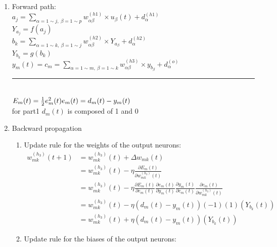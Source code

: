 \documentclass[12pt,a4paper]{article}
\begin{document}
\begin{CJK}{UTF8}{bsmi}
\begin{enumerate}
	\vspace{0.7cm}
	\item Forward path:
\vspace{0.5cm}
\\	
	$a_j=\sum\limits_{\alpha=1 \sim j,\  \beta=1 \sim p}
w_{\alpha\beta}^{(h1)} \times u_\beta(t)+d_\alpha^{(h1)} $
\vspace{0.5cm}
\\
	$Y_{a_j}=f(a_j)$
\vspace{0.5cm}
\\
	$b_k=\sum\limits_{\alpha=1 \sim k,\  \beta=1 \sim j}
w_{\alpha\beta}^{(h2)} \times Y_{a_\beta}+d_\alpha^{(h2)} $
\vspace{0.5cm}
\\
	$Y_{b_k}=g(b_k)$
\vspace{0.5cm}
\\
	$y_m(t)=c_m=\sum\limits_{\alpha=1 \sim m,\  \beta=1 \sim k}
	w_{\alpha\beta}^{(h3)} \times y_{b_\beta}+d_\alpha^{(o)} $
\\[0.5cm]
\noindent\rule{\textwidth}{1pt}
\\[0.5cm]
$E_m(t)=\frac{1}{2}e_m^2(t)
\\[0.5cm]
e_m(t)=d_m(t)-y_m(t)
$
\\[0.3cm]
for part1 $d_m(t)$ is composed of 1 and 0
\newpage
\item Backward propagation
\begin{enumerate}
	\item Update rule for the weights of the output neurons:
\vspace{0.5cm}
\\
$
	\begin{aligned}
	w_{mk}^{(h_3)}(t+1) & =w_{mk}^{(h_3)}(t)+\Delta w_{mk}(t)
\\[0.5cm]
	& =	w_{mk}^{(h_3)}(t)-\eta\frac{\partial E_m(t)}{\partial w_{mk}^{(h_3)}(t)}
\\[0.5cm]
	& = w_{mk}^{(h_3)}(t)-\eta\frac{\partial E_m(t)}{\partial e_{m}(t)}
	\frac{\partial e_{m}(t)}{\partial y_m(t)}
	\frac{\partial y_m(t)}{\partial c_{m}(t)}
	\frac{\partial c_m(t)}{\partial w_{mk}^{(h_3)}(t)}
\\[0.5cm]
	& = w_{mk}^{(h_3)}(t)-\eta(d_m(t)-y_m(t))(-1)(1)(Y_{b_k}(t))
\\[0.5cm]
	& = w_{mk}^{(h_3)}(t)+\eta(d_m(t)-y_m(t))(Y_{b_k}(t))	
	\end{aligned}
$
	\item Update rule for the biases of the output neurons:
\vspace{0.5cm}

\end{enumerate}
\end{enumerate}
\end{CJK}
\end{document}
